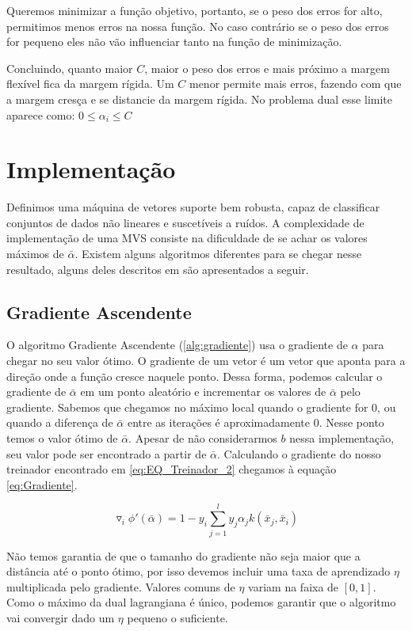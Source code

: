 Queremos minimizar a função objetivo, portanto, se o peso dos erros for alto, permitimos menos erros na nossa função. No caso contrário se o peso dos erros for pequeno eles não vão influenciar tanto na função de minimização.

Concluindo,  quanto maior $C$, maior o peso dos erros e mais próximo a margem flexível fica da margem rígida. Um $C$ menor permite mais erros, fazendo com que a margem cresça e se distancie da margem rígida. No problema dual esse limite aparece como: $0\le \alpha_i \le C$

\section{Implementação}
Definimos uma máquina de vetores suporte bem robusta, capaz de classificar conjuntos de dados não lineares e suscetíveis a ruídos. A complexidade de implementação de uma MVS consiste na dificuldade de se achar os valores máximos de $\bar{\alpha}$. Existem alguns algoritmos diferentes para se chegar nesse resultado, alguns deles descritos em \cite{art:LIVRO_SVM} são apresentados a seguir.

\subsection{Gradiente Ascendente}\label{sec:gradiente}
O algoritmo Gradiente Ascendente (\ref{alg:gradiente}) usa o gradiente de $\alpha$ para chegar no seu valor ótimo. O gradiente de um vetor é um vetor que aponta para a direção onde a função cresce naquele ponto. Dessa forma, podemos calcular o gradiente de $\bar{\alpha}$ em um ponto aleatório e incrementar os valores de $\bar{\alpha}$ pelo gradiente. Sabemos que chegamos no máximo local quando o gradiente for $0$, ou quando a diferença de $\bar{\alpha}$ entre as iterações é aproximadamente $0$. Nesse ponto temos o valor ótimo de $\bar{\alpha}$. Apesar de não considerarmos $b$ nessa implementação, seu valor pode ser encontrado a partir de $\bar{\alpha}$. Calculando o gradiente do nosso treinador encontrado em \ref{eq:EQ_Treinador_2} chegamos à equação \ref{eq:Gradiente}.

\begin{equation}
    \triangledown_i {\phi}'(\bar{\alpha}) = 1-y_i\sum_{j=1}^ly_j\alpha_jk(\bar{x}_j,\bar{x}_i)
    \label{eq:Gradiente}
\end{equation}

Não temos garantia de que o tamanho do gradiente não seja maior que a distância até o ponto ótimo, por isso devemos incluir uma taxa de aprendizado $\eta$ multiplicada pelo gradiente. Valores comuns de $\eta$ variam na faixa de $[0,1]$. Como o máximo da dual lagrangiana é único, podemos garantir que o algoritmo vai convergir dado um $\eta$ pequeno o suficiente.


